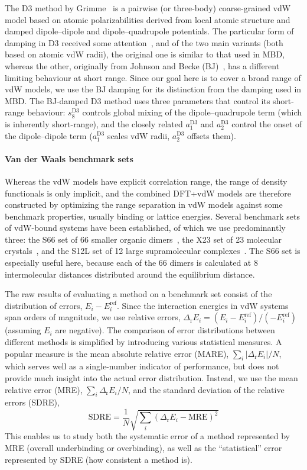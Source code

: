 The D3 method by Grimme~\cite{GrimmeJCP10} is a pairwise (or three-body) coarse-grained vdW model based on atomic polarizabilities derived from local atomic structure and damped dipole--dipole and dipole--quadrupole potentials.
The particular form of damping in D3 received some attention~\cite{GrimmeJCC11,SchroderJCTC15,SmithJPCL16,WitteJCTC17}, and of the two main variants (both based on atomic vdW radii), the original one is similar to that used in MBD, whereas the other, originally from Johnson and Becke (BJ)~\cite{JohnsonJCP06}, has a different limiting behaviour at short range.
Since our goal here is to cover a broad range of vdW models, we use the BJ damping for its distinction from the damping used in MBD\@.
The BJ-damped D3 method uses three parameters that control its short-range behaviour: $s_8^\text{D3}$ controls global mixing of the dipole--quadrupole term (which is inherently short-range), and the closely related $a_1^\text{D3}$ and $a_2^\text{D3}$ control the onset of the dipole--dipole term ($a_1^\text{D3}$ scales vdW radii, $a_2^\text{D3}$ offsets them).

\paragraph{Van der Waals benchmark sets}

Whereas the vdW models have explicit correlation range, the range of density functionals is only implicit, and the combined DFT+vdW models are therefore constructed by optimizing the range separation in vdW models against some benchmark properties, usually binding or lattice energies.
Several benchmark sets of vdW-bound systems have been established, of which we use predominantly three: the S66 set of 66 smaller organic dimers~\cite{RezacJCTC11}, the X23 set of 23 molecular crystals~\cite{ReillyJCP13}, and the S12L set of 12 large supramolecular complexes~\cite{RisthausJCTC13}.
The S66 set is especially useful here, because each of the 66 dimers is calculated at 8 intermolecular distances distributed around the equilibrium distance.

The raw results of evaluating a method on a benchmark set consist of the distribution of errors, $E_i-E_i^\text{ref}$.
Since the interaction energies in vdW systems span orders of magnitude, we use relative errors, $\Delta_\mathrm rE_i=(E_i-E_i^\text{ref})/(-E_i^\text{ref})$ (assuming $E_i$ are negative).
The comparison of error distributions between different methods is simplified by introducing various statistical measures.
A popular measure is the mean absolute relative error (MARE), $\sum_i\lvert\Delta_\mathrm rE_i\rvert/N$, which serves well as a single-number indicator of performance, but does not provide much insight into the actual error distribution.
Instead, we use the mean relative error (MRE), $\sum_i\Delta_\mathrm rE_i/N$, and the standard deviation of the relative errors (SDRE),
\[ \text{SDRE}=\frac1N\sqrt{\sum_i(\Delta_\mathrm rE_i-\text{MRE})^2} \]
This enables us to study both the systematic error of a method represented by MRE (overall underbinding or overbinding), as well as the ``statistical'' error represented by SDRE (how consistent a method is).

